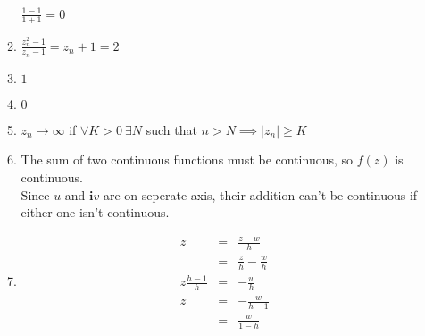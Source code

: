 \documentclass{article}%
\newcommand\abs[1]{\left|#1\right|}
\newcommand\I{\textbf{i}}
\begin{document}
\begin{enumerate}
\begin{enumerate}[label*=\arabic*.]
            $\frac{1-1}{1+1}=0$
        \item %
            $\frac{z_n^2 - 1}{z_n - 1} = z_n+1 = 2$
        \item %
            $1$
        \item %
            $0$
        \item %
            $z_n \to \infty$ if $\forall K>0\ \exists N$ such that $n>N \implies \abs{z_n}\geq K$
        \setcounter{enumii}{24}
        \item %
            The sum of two continuous functions must be continuous, so $f(z)$ is continuous. \\
            Since $u$ and $\I v$ are on seperate axis, their addition can't be continuous if either one isn't continuous.
        \setcounter{enumii}{27}
        \item %
        \begin{eqnarray*}
            z &=& \frac{z-w}{h} \\
              &=& \frac{z}{h}-\frac{w}{h} \\
           z\frac{h-1}{h} &=& -\frac{w}{h} \\
           z &=& -\frac{w}{h-1} \\
             &=& \frac{w}{1-h} 
        \end{eqnarray*}
    \end{enumerate}
\end{enumerate}
\end{document}
